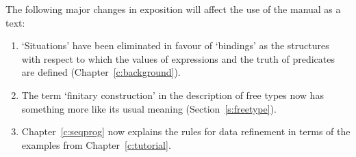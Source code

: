 The following major changes in exposition will affect the use of the
manual as a text:
\begin{enumerate}
\item `Situations' have been eliminated in favour of `bindings' as
	the structures with respect to which the values of
	expressions and the truth of predicates are defined
	(Chapter~\ref{c:background}).

\item The term `finitary construction' in the description of free
	types now has something more like its usual meaning
	(Section~\ref{s:freetype}).

\item Chapter~\ref{c:seqprog} now explains the rules for data
	refinement in terms of the examples from
	Chapter~\ref{c:tutorial}.
\end{enumerate}

